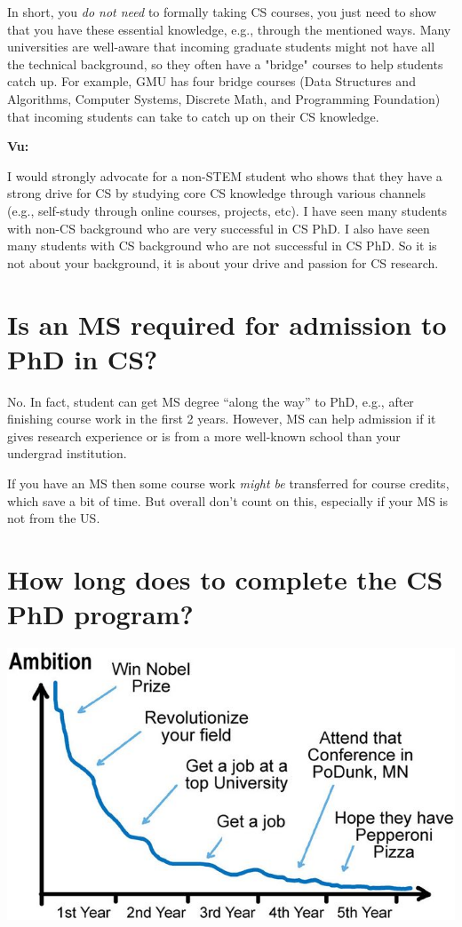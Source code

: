 \documentclass[oneside,11pt]{book}
\newenvironment{commentbox}[1][]{
  \small
  \begin{mybox}
    {\small \textbf{#1}}
  }{
  \end{mybox}
}
\begin{document}
In short, you \emph{do not need} to formally taking CS courses, you just need to show that you have these essential knowledge, e.g., through the mentioned ways. Many universities are well-aware that incoming graduate students might not have all the technical background, so they often have a "bridge" courses to help students catch up.  For example, GMU has four bridge courses (Data Structures and Algorithms, Computer Systems, Discrete Math, and Programming Foundation) that incoming students can take to catch up on their CS knowledge.

\begin{commentbox}[Vu:]
  I would strongly advocate for a non-STEM student who shows that they have a strong drive for CS by studying core CS knowledge through various channels (e.g., self-study through online courses, projects, etc).  I have seen many students with non-CS background who are very successful in CS PhD.  I also have seen many students with CS background who are not successful in CS PhD.  So it is not about your background, it is about your drive and passion for CS research.
\end{commentbox}

\section{Is an MS required for admission to PhD in CS?}\label{sec:msrequirement}
No. In fact, student can get MS degree ``along the way'' to PhD, e.g., after finishing course work in the first 2 years.  However, MS can help admission if it gives research experience or is from a more well-known school than your undergrad institution. 

If you have an MS then some course work \emph{might be} transferred for course credits, which save a bit of time. But overall don't count on this, especially if your MS is not from the US. 


\section{How long does to complete the CS PhD program?}\label{sec:time}


\begin{center}
  \includegraphics[scale=0.5]{files/c4a.png}
\end{center}
\end{document}
